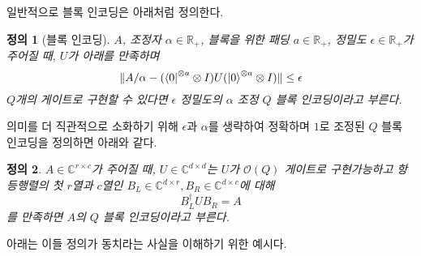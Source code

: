 \documentclass[hidelinks,article,a4paper,chapter,twocolumn]{oblivoir}
\newtheorem{defn}{정의}[chapter]
\begin{document}
일반적으로 블록 인코딩은 \cite{Gilyen2019,Rall2020} 아래처럼 정의한다.
\begin{defn}[블록 인코딩]
  $A$, 조정자 $\alpha\in\mathbb{R}_{+}$, 블록을 위한 패딩 $a\in\mathbb{R}_+$,
  정밀도 $\epsilon\in\mathbb{R}_+$가 주어질 때, $U$가 아래를 만족하며
  \begin{equation}
    \|A/\alpha-(\bra0^{\otimes a}\otimes I)U(\ket0^{\otimes a}\otimes I)\|\leq
    \epsilon
  \end{equation}
  $Q$개의 게이트로 구현할 수 있다면 $\epsilon$ 정밀도의 $\alpha$ 조정
  $Q$ 블록 인코딩이라고 부른다.
\end{defn}
의미를 더 직관적으로 소화하기 위해 $\epsilon$과 $\alpha$를 생략하여
정확하며 $1$로 조정된 $Q$ 블록 인코딩을 정의하면 아래와 같다.
\begin{defn}
  $A\in\mathbb{C}^{r\times c}$가 주어질 때, $U\in\mathbb{C}^{d\times d}$는
  $U$가 $\mathcal{O}(Q)$ 게이트로 구현가능하고 항등행렬의 첫 $r$열과 $c$열인
  $B_{L}\in\mathbb{C}^{d\times r},B_{R}\in\mathbb{C}^{d\times c}$에 대해
  \begin{equation}\label{eq:1-1}
    B_{L}^{\dagger}UB_{R} = A
  \end{equation}
  를 만족하면 $A$의 $Q$ 블록 인코딩이라고 부른다. 
\end{defn}
아래는 이들 정의가 동치라는 사실을 이해하기 위한 예시다.
\end{document}

